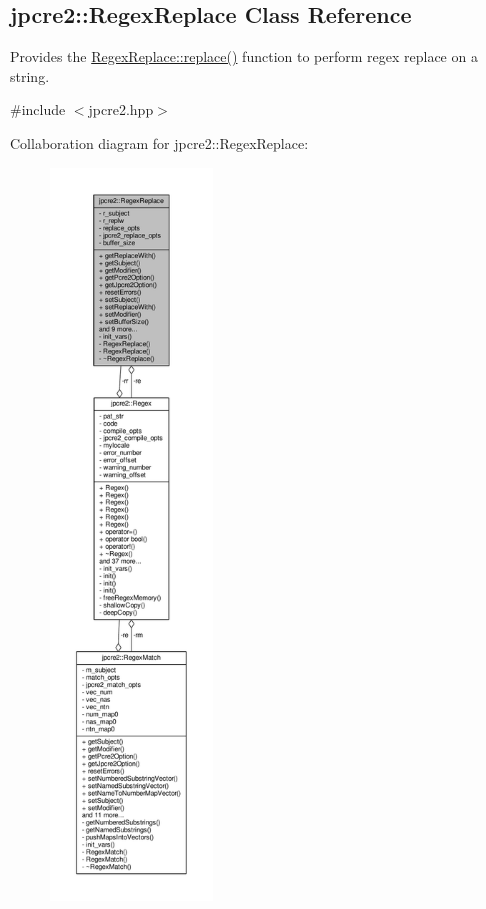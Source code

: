 \hypertarget{classjpcre2_1_1RegexReplace}{}\subsection{jpcre2\+:\+:Regex\+Replace Class Reference}
\label{classjpcre2_1_1RegexReplace}


Provides the \hyperlink{classjpcre2_1_1RegexReplace_afd087fa7a9bfedec802d1a3dd7edbdd0_afd087fa7a9bfedec802d1a3dd7edbdd0}{Regex\+Replace\+::replace()} function to perform regex replace on a string.  




{\ttfamily \#include $<$jpcre2.\+hpp$>$}



Collaboration diagram for jpcre2\+:\+:Regex\+Replace\+:\nopagebreak
\begin{figure}[H]
\begin{center}
\leavevmode
\includegraphics[height=550pt]{classjpcre2_1_1RegexReplace__coll__graph}
\end{center}
\end{figure}
